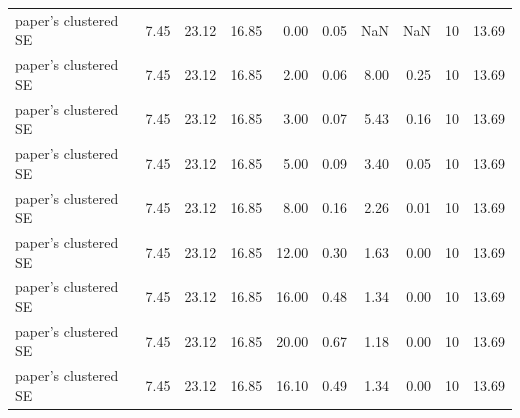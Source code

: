 \begin{tabular}{lrrrrrrrrr}
paper's clustered SE & 7.45 & 23.12 & 16.85 & 0.00 & 0.05 & NaN & NaN & 10 & 13.69 \\
paper's clustered SE & 7.45 & 23.12 & 16.85 & 2.00 & 0.06 & 8.00 & 0.25 & 10 & 13.69 \\
paper's clustered SE & 7.45 & 23.12 & 16.85 & 3.00 & 0.07 & 5.43 & 0.16 & 10 & 13.69 \\
paper's clustered SE & 7.45 & 23.12 & 16.85 & 5.00 & 0.09 & 3.40 & 0.05 & 10 & 13.69 \\
paper's clustered SE & 7.45 & 23.12 & 16.85 & 8.00 & 0.16 & 2.26 & 0.01 & 10 & 13.69 \\
paper's clustered SE & 7.45 & 23.12 & 16.85 & 12.00 & 0.30 & 1.63 & 0.00 & 10 & 13.69 \\
paper's clustered SE & 7.45 & 23.12 & 16.85 & 16.00 & 0.48 & 1.34 & 0.00 & 10 & 13.69 \\
paper's clustered SE & 7.45 & 23.12 & 16.85 & 20.00 & 0.67 & 1.18 & 0.00 & 10 & 13.69 \\
paper's clustered SE & 7.45 & 23.12 & 16.85 & 16.10 & 0.49 & 1.34 & 0.00 & 10 & 13.69 \\
\bottomrule
\end{tabular}
